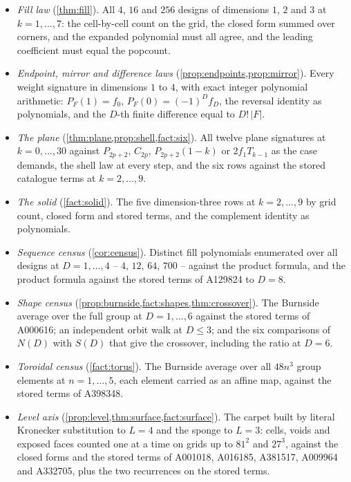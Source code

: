 \documentclass[11pt]{amsart}
\theoremstyle{definition}
\theoremstyle{remark}
\begin{document}
\begin{itemize}
\item \emph{Fill law} (\cref{thm:fill}). All $4$, $16$ and $256$ designs of dimensions $1$, $2$ and $3$ at $k = 1,\dots,7$: the cell-by-cell count on the grid, the closed form summed over corners, and the expanded polynomial must all agree, and the leading coefficient must equal the popcount.
\item \emph{Endpoint, mirror and difference laws} (\cref{prop:endpoints,prop:mirror}). Every weight signature in dimensions $1$ to $4$, with exact integer polynomial arithmetic: $P_{F}(1)=f_{0}$, $P_{F}(0)=(-1)^{D}f_{D}$, the reversal identity as polynomials, and the $D$-th finite difference equal to $D!\,|F|$.
\item \emph{The plane} (\cref{thm:plane,prop:shell,fact:six}). All twelve plane signatures at $k = 0,\dots,30$ against $P_{2p+2}$, $C_{2p}$, $P_{2p+2}(1-k)$ or $2f_{1}T_{k-1}$ as the case demands, the shell law at every step, and the six rows against the stored catalogue terms at $k = 2,\dots,9$.
\item \emph{The solid} (\cref{fact:solid}). The five dimension-three rows at $k=2,\dots,9$ by grid count, closed form and stored terms, and the complement identity as polynomials.
\item \emph{Sequence census} (\cref{cor:census}). Distinct fill polynomials enumerated over all designs at $D = 1,\dots,4$ -- $4$, $12$, $64$, $700$ -- against the product formula, and the product formula against the stored terms of A129824 to $D=8$.
\item \emph{Shape census} (\cref{prop:burnside,fact:shapes,thm:crossover}). The Burnside average over the full group at $D = 1,\dots,6$ against the stored terms of A000616; an independent orbit walk at $D \le 3$; and the six comparisons of $N(D)$ with $S(D)$ that give the crossover, including the ratio at $D=6$.
\item \emph{Toroidal census} (\cref{fact:torus}). The Burnside average over all $48n^{3}$ group elements at $n = 1,\dots,5$, each element carried as an affine map, against the stored terms of A398348.
\item \emph{Level axis} (\cref{prop:level,thm:surface,fact:surface}). The carpet built by literal Kronecker substitution to $L=4$ and the sponge to $L=3$: cells, voids and exposed faces counted one at a time on grids up to $81^{2}$ and $27^{3}$, against the closed forms and the stored terms of A001018, A016185, A381517, A009964 and A332705, plus the two recurrences on the stored terms.

\end{itemize}
\end{document}
